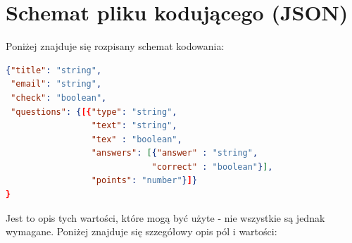 \section{Schemat pliku kodującego (JSON)}
Poniżej znajduje się rozpisany schemat kodowania: 
\begin{lstlisting}[language=json,firstnumber=1]
{"title": "string",
 "email": "string",
 "check": "boolean",
 "questions": {[{"type": "string", 
                 "text": "string",
                 "tex" : "boolean",
                 "answers": [{"answer" : "string",
                             "correct" : "boolean"}],
                 "points": "number"}]}
}

\end{lstlisting}
Jest to opis tych wartości, które mogą być użyte - nie wszystkie są jednak  wymagane. Poniżej znajduje się szzegółowy opis pól i wartości:
